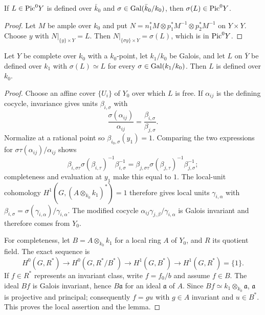 \begin{lemma}
\label{mumford-lem-appI-piczero-galois}
If $L\in{\rm Pic}^0Y$ is defined over $\bar k_0$ and $\sigma\in
{\rm Gal}(\bar k_0/k_0)$, then $\sigma(L)\in{\rm Pic}^0Y$.
\end{lemma}
\begin{proof}
Let $M$ be ample over $k_0$ and put
$N=n_1^*M\otimes p_1^*M^{-1}\otimes p_2^*M^{-1}$ on $Y\times Y$.
Choose $y$ with $N|_{\{y\}\times Y}=L$. Then
$N|_{\{\sigma y\}\times Y}=\sigma(L)$, which is in ${\rm Pic}^0Y$.

\end{proof}


\begin{lemma}
\label{mumford-lem-appI-line-bundle-descent}
Let $Y$ be complete over $k_0$ with a $k_0$-point, let $k_1/k_0$ be Galois,
and let $L$ on $\overline Y$ be defined over $k_1$ with
$\sigma(L)\simeq L$ for every $\sigma\in{\rm Gal}(k_1/k_0)$. Then $L$ is
defined over $k_0$.
\end{lemma}
\begin{proof}
Choose an affine cover $\{U_i\}$ of $Y_0$ over which $L$ is free. If
$\alpha_{ij}$ is the defining cocycle, invariance gives units $\beta_{i,\sigma}$
with
\[
 \frac{\sigma(\alpha_{ij})}{\alpha_{ij}}=\frac{\beta_{i,\sigma}}{\beta_{j,\sigma}}.
\]
Normalize at a rational point so $\beta_{i_0,\sigma}(y_1)=1$. Comparing the
two expressions for $\sigma\tau(\alpha_{ij})/\alpha_{ij}$ shows
\[
 \beta_{i,\sigma\tau}\sigma(\beta_{i,\tau})^{-1}\beta_{i,\sigma}^{-1}
 =\beta_{j,\sigma\tau}\sigma(\beta_{j,\tau})^{-1}\beta_{j,\sigma}^{-1};
\]
completeness and evaluation at $y_1$ make this equal to $1$. The local-unit
cohomology $H^1(G,(A\otimes_{k_0}k_1)^*)=1$ therefore gives local units
$\gamma_{i,\alpha}$ with
$\beta_{i,\sigma}=\sigma(\gamma_{i,\alpha})/\gamma_{i,\alpha}$.
The modified cocycle
$\alpha_{ij}\gamma_{j,\beta}/\gamma_{i,\alpha}$ is Galois invariant and
therefore comes from $Y_0$.

For completeness, let $B=A\otimes_{k_0}k_1$ for a local ring $A$ of $Y_0$,
and $R$ its quotient field. The exact sequence is
\[
 H^0(G,R^*)\to H^0(G,R^*/B^*)\to H^1(G,B^*)\to H^1(G,R^*)=\{1\}.
\]
If $f\in R^*$ represents an invariant class, write $f=f_0/b$ and assume
$f\in B$. The ideal $Bf$ is Galois invariant, hence $B\mathfrak a$ for an
ideal $\mathfrak a$ of $A$. Since $Bf\simeq k_1\otimes_{k_0}\mathfrak a$,
$\mathfrak a$ is projective and principal; consequently $f=gu$ with
 $g\in A$ invariant and $u\in B^*$. This proves the local assertion and the
 lemma.

\end{proof}


